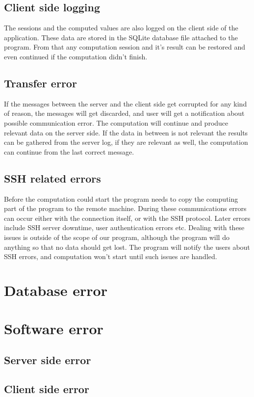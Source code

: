 \documentclass[10pt,a4paper]{report}
\begin{document}
\subsection{Client side logging}
The sessions and the computed values are also logged on the client side of the application. These data are stored in the SQLite database file attached to the program. From that any computation session and it's result can be restored and even continued if the computation didn't finish.

\subsection{Transfer error}
If the messages between the server and the client side get corrupted for any kind of reason, the messages will get discarded, and user will get a notification about possible communication error. The computation will continue and produce relevant data on the server side. If the data in between is not relevant the results can be gathered from the server log, if they are relevant as well, the computation can continue from the last correct message.

\subsection{SSH related errors}
Before the computation could start the program needs to copy the computing part of the program to the remote machine. During these communications errors can occur either with the connection itself, or with the SSH protocol. Later errors include SSH server downtime, user authentication errors etc. Dealing with these issues is outside of the scope of our program, although the program will do anything so that no data should get lost. The program will notify the users about SSH errors, and computation won't start until such issues are handled.

\section{Database error}


\section{Software error}
\subsection{Server side error}
\subsection{Client side error}
\end{document}
